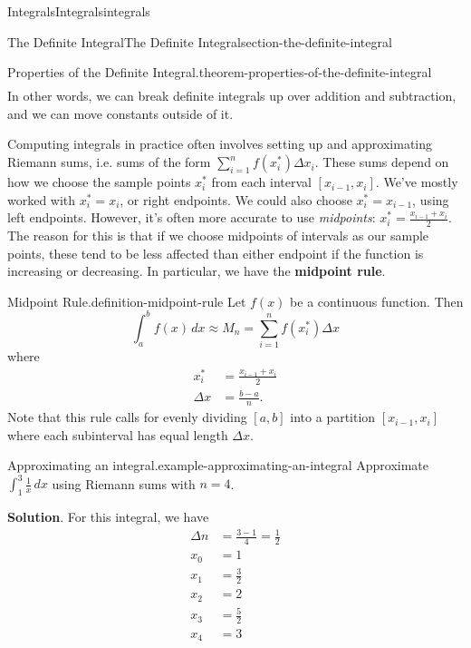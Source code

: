 \documentclass[oneside,10pt,]{book}
\newcommand{\terminology}[1]{\textbf{#1}}
\numberwithin{equation}{section}
\begin{document}
\begin{chapterptx}{Integrals}{}{Integrals}{}{}{integrals}
\begin{sectionptx}{The Definite Integral}{}{The Definite Integral}{}{}{section-the-definite-integral}
\begin{theorem}{Properties of the Definite Integral.}{}{theorem-properties-of-the-definite-integral}
\begin{align*}
\end{align*}
In other words, we can break definite integrals up over addition and subtraction, and we can move constants outside of it.%
\end{theorem}
\hypertarget{p-437}{}%
Computing integrals in practice often involves setting up and approximating Riemann sums, i.e. sums of the form \(\sum_{i=1}^{n}f(x_{i}^{*})\Delta x_{i}\). These sums depend on how we choose the sample points \(x_{i}^{*}\) from each interval \([x_{i-1},x_{i}]\). We've mostly worked with \(x_{i}^{*} = x_{i}\), or right endpoints. We could also choose \(x_{i}^{*} = x_{i-1}\), using left endpoints. However, it's often more accurate to use \emph{midpoints}: \(x_{i}^{*} = \frac{x_{i-1}+x_{i}}{2}\). The reason for this is that if we choose midpoints of intervals as our sample points, these tend to be less affected than either endpoint if the function is increasing or decreasing. In particular, we have the \terminology{midpoint rule}.%
\begin{definition}{Midpoint Rule.}{definition-midpoint-rule}%
\hypertarget{p-438}{}%
Let \(f(x)\) be a continuous function. Then%
\begin{equation*}
\int_{a}^{b}f(x)\,dx \approx M_{n} = \sum_{i=1}^{n}f(x_{i}^{*})\Delta x
\end{equation*}
where%
\begin{align*}
x_{i}^{*} & = \frac{x_{i-1}+x_{i}}{2} \\
\Delta x & = \frac{b-a}{n}. 
\end{align*}
Note that this rule calls for evenly dividing \([a,b]\) into a partition \([x_{i-1},x_{i}]\) where each subinterval has equal length \(\Delta x\).%
\end{definition}
\begin{example}{Approximating an integral.}{example-approximating-an-integral}%
\hypertarget{p-439}{}%
Approximate \(\int_{1}^{3}\frac{1}{x}\,dx\) using Riemann sums with \(n=4\).%
\par\smallskip%
\noindent\textbf{Solution}.\hypertarget{solution-96}{}\quad%
\hypertarget{p-440}{}%
For this integral, we have%
\begin{align*}
\Delta n & = \frac{3-1}{4} = \frac{1}{2} \\
x_{0} & = 1 \\
x_{1} & = \frac{3}{2} \\
x_{2} & = 2 \\
x_{3} & = \frac{5}{2} \\
x_{4} & = 3 
\end{align*}

\end{example}
\end{sectionptx}
\end{chapterptx}
\end{document}
